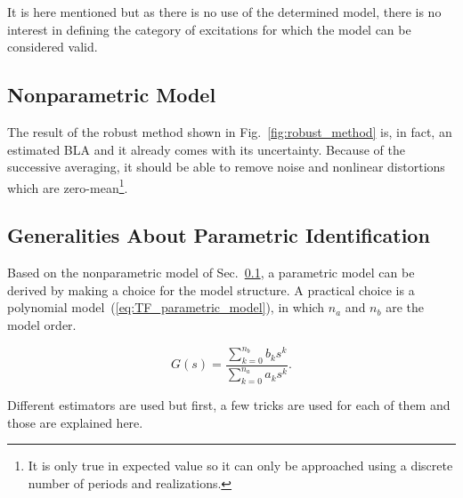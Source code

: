 It is here mentioned but as there is no use of the determined model, there is no interest in defining the category of excitations for which the model can be considered valid.




\subsection{Nonparametric Model}
\label{sec:non_parametric_model}

The result of the robust method shown in Fig.~\ref{fig:robust_method} is, in fact, an estimated BLA and it already comes with its uncertainty. Because of the successive averaging, it should be able to remove noise and nonlinear distortions which are zero-mean\footnote{It is only true in expected value so it can only be approached using a discrete number of periods and realizations.}.




\subsection{Generalities About Parametric Identification}
\label{sec:parametric_model}

Based on the nonparametric model of Sec.~\ref{sec:non_parametric_model}, a parametric model can be derived by making a choice for the model structure. A practical choice is a polynomial model~(\ref{eq:TF_parametric_model}), in which $n_a$ and $n_b$ are the model order.

\begin{equation}
    G(s) = \frac{\sum_{k=0}^{n_b} b_k s^k}{\sum_{k=0}^{n_a} a_k s^k}.
    \label{eq:TF_parametric_model}
\end{equation}

Different estimators are used but first, a few tricks are used for each of them and those are explained here.


